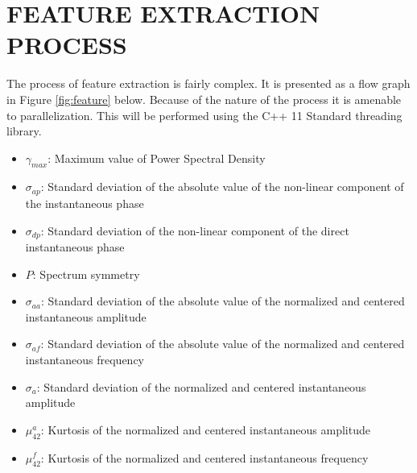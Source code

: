 \documentclass[10pt,twocolumn]{witseiepaper}
\begin{document}
\section{FEATURE EXTRACTION PROCESS}
\label{app:feature}
The process of feature extraction is fairly complex. It is presented as a flow graph in Figure \ref{fig:feature} below. Because of the nature of the process it is amenable to parallelization. This will be performed using the C++ 11 Standard threading library.

\begin{itemize}
	\item $\gamma_{max}$: Maximum value of Power Spectral Density 
	\item $\sigma_{ap}$: Standard deviation of the absolute value of the non-linear component of the instantaneous phase
	\item $\sigma_{dp}$: Standard deviation of the non-linear component of the direct instantaneous phase
	\item $P$: Spectrum symmetry
	\item $\sigma_{aa}$: Standard deviation of the absolute value of the normalized and centered instantaneous amplitude
	\item $\sigma_{af}$: Standard deviation of the absolute value of the normalized and centered instantaneous frequency
	\item $\sigma_{a}$: Standard deviation of the normalized and centered instantaneous amplitude
	\item $\mu_{42}^{a}$: Kurtosis of the normalized and centered instantaneous amplitude
	\item $\mu_{42}^{f}$: Kurtosis of the normalized and centered instantaneous frequency
\end{itemize}
\end{document}
